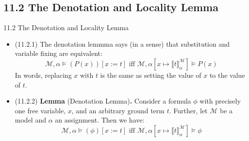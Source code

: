 \documentclass[../slides.tex]{subfiles}
\begin{document}
\subsection{11.2 The Denotation and Locality Lemma}
\begin{frame}{11.2 The Denotation and Locality Lemma}

  \begin{itemize}

  \item (11.2.1) The denotation lemmma says (in a sense) that substitution and
    variable fixing are equivalent:
    \[\mathcal{M},\alpha\vDash (P(x))[x:=t]\text{ iff
      }\mathcal{M},\alpha[x\mapsto\llbracket
      t\rrbracket^\mathcal{M}_\alpha]\vDash P(x)\]
    In words, replacing $x$ with $t$ is the same as setting the value
    of $x$ to the value of $t$.

    \item (11.2.2) \textbf{Lemma} (Denotation Lemma)\textbf{.}
      Consider a formula $\phi$ with precisely one free
            variable, $x$, and an arbitrary ground term $t$. Further,
            let $\mathcal{M}$ be a model and
            $\alpha$ an assignment. Then we have:
            \[\mathcal{M},\alpha\vDash (\phi)[x:=t]\text{ iff
              }\mathcal{M},\alpha[x\mapsto \llbracket
              t\rrbracket^\mathcal{M}_\alpha]\vDash \phi\]
    
  \end{itemize}
  
\end{frame}
\end{document}

